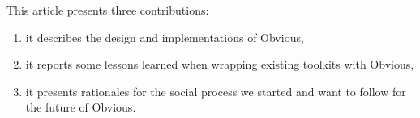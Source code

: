 This article presents three contributions:
\begin{enumerate}
\item it describes the design and implementations of Obvious,
\item it reports some lessons learned when wrapping existing toolkits
  with Obvious,
\item it presents rationales for the social process we started and
  want to follow for the future of Obvious.
\end{enumerate}

\begin{comment}
Obvious is implemented in a modular way with an abstract core module
and additional specific bindings, implemented for several toolkits:
the Infovis toolkit~\cite{InfoVis}, Prefuse~\cite{Prefuse},
Improvise~\cite{Improvise} and Jung~\cite{jung2003}.  These bindings
have been used to build some proof-of-concepts examples combining
different toolkits and also to create complete systems used by ongoing
research projects such as~\cite{BENZAKEN:2011:INRIA-00532552:1}.

During the development of bindings, we have seen important design
questions emerge regarding the interpretation of the reference model;
we report them here to help clarify the InfoVis reference model and
trade-offs in its implementation.

In addition, Obvious allows developers to eliminate the crucial choice
of the toolkit and to avoid rewriting existing functionalities such as
file import and export modules, as well as analytical algorithms. The
following use case shows it is now possible to combine toolkits.  For
example, they can choose a data model from JUNG toolkit for a graph,
then query it with Prefuse predicates, use a layout introduced in
Infovis toolkit to display it and still used network algorithms
introduced in JUNG.  With obvious, there are no more design restrictions
imposed by an initial choice for developer.



Obvious is not another toolkit, it is a set of interfaces that
abstract the services provided by information visualization toolkits
implemented according to the InfoVis reference
model~\cite{ChiRefModel,ReadingsIV}.  Obvious has been specified
during a workshop gathering several major authors of
toolkits~\cite{vismaster2008}; its interfaces have reached a consensus
at the time of the workshop among the developers.  However, they do
not cover all the parts of the reference model evenly.  The data
component is much more precisely defined than the visualization and
view components. 


\end{comment}
